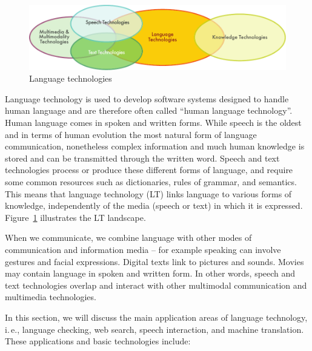 \label{LTforIrish_en}

\begin{multicols}{2}


\begin{figure}[htb]
  \center
  \includegraphics[width=\textwidth]{../_media/english/language_technologies}
  \caption{Language technologies}
  \label{fig:ltincontext_en}
\end{figure}


Language technology is used to develop software systems designed to handle human language and are therefore often called ``human language technology''. Human language comes in spoken and written forms. While speech is the oldest and in terms of human evolution the most natural form of language communication, nonetheless complex information and much human knowledge is stored and can be transmitted through the written word. Speech and text technologies process or produce these different forms of language, and require some common resources such as dictionaries, rules of grammar, and semantics. This means that language technology (LT) links language to various forms of knowledge, independently of the media (speech or text) in which it is expressed. Figure~\ref{fig:ltincontext_en} illustrates the LT landscape.



When we communicate, we combine language with other modes of communication and information media -- for example speaking can involve gestures and facial expressions. Digital texts link to pictures and sounds. Movies may contain language in spoken and written form. In other words, speech and text technologies overlap and interact with other multimodal communication and multimedia technologies.

In this section, we will discuss the main application areas of language technology, i.\,e., language checking, web search, speech interaction, and machine translation. These applications and basic technologies include:


\end{multicols}
